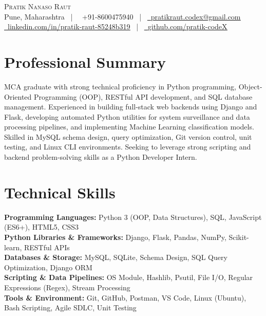 \documentclass[letterpaper,10.5pt]{article}
\newcommand{\faPhone}{}
\newcommand{\faEnvelope}{}
\newcommand{\faLinkedin}{}
\newcommand{\faGithub}{}
\begin{document}
\begin{center}
    {\Huge \scshape Pratik Nanaso Raut} \\ \vspace{2pt}
    \small Pune, Maharashtra ~|~
    \faPhone\ +91-8600475940 ~|~
    \href{mailto:pratikraut.codex@gmail.com}{\faEnvelope\ \underline{pratikraut.codex@gmail.com}} \\ \vspace{2pt}
    \href{https://linkedin.com/in/pratik-raut-85248b319}{\faLinkedin\ \underline{linkedin.com/in/pratik-raut-85248b319}} ~|~
    \href{https://github.com/pratik-codeX}{\faGithub\ \underline{github.com/pratik-codeX}}
\end{center}

\vspace{-6pt}

\section{Professional Summary}
MCA graduate with strong technical proficiency in Python programming, Object-Oriented Programming (OOP), RESTful API development, and SQL database management. Experienced in building full-stack web backends using Django and Flask, developing automated Python utilities for system surveillance and data processing pipelines, and implementing Machine Learning classification models. Skilled in MySQL schema design, query optimization, Git version control, unit testing, and Linux CLI environments. Seeking to leverage strong scripting and backend problem-solving skills as a Python Developer Intern.

\section{Technical Skills}
\vspace{1pt}
\textbf{Programming Languages:} Python 3 (OOP, Data Structures), SQL, JavaScript (ES6+), HTML5, CSS3 \\[1.5pt]
\textbf{Python Libraries \& Frameworks:} Django, Flask, Pandas, NumPy, Scikit-learn, RESTful APIs \\[1.5pt]
\textbf{Databases \& Storage:} MySQL, SQLite, Schema Design, SQL Query Optimization, Django ORM \\[1.5pt]
\textbf{Scripting \& Data Pipelines:} OS Module, Hashlib, Psutil, File I/O, Regular Expressions (Regex), Stream Processing \\[1.5pt]
\textbf{Tools \& Environment:} Git, GitHub, Postman, VS Code, Linux (Ubuntu), Bash Scripting, Agile SDLC, Unit Testing
\vspace{-2pt}
\end{document}
